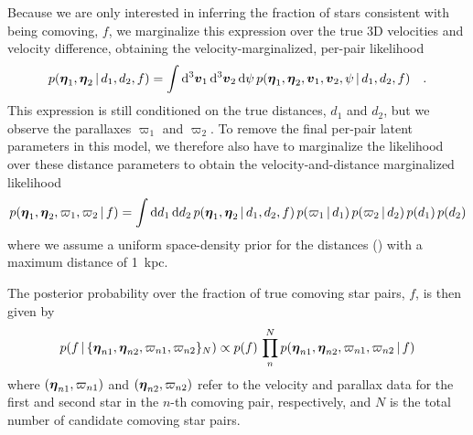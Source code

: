 \documentclass[modern, letterpaper]{aastex61}
\begin{document}
Because we are only interested in inferring the fraction of stars consistent
with being comoving, $f$, we marginalize this expression over the true 3D
velocities and velocity difference, obtaining the velocity-marginalized,
per-pair likelihood
\begin{equation}
    p(\bs{\eta}_1, \bs{\eta}_2 \given d_1, d_2, f) =
    \int \dd^3\bs{v}_1 \, \dd^3\bs{v}_2 \, \dd \psi \,
    p(\bs{\eta}_1, \bs{\eta}_2, \bs{v}_1, \bs{v}_2, \psi \given d_1, d_2, f)
    \quad . \label{eq:vel-marg}
\end{equation}
This expression is still conditioned on the true distances, $d_1$ and $d_2$, but
we observe the parallaxes $\varpi_1$ and $\varpi_2$.
To remove the final per-pair latent parameters in this model, we therefore also
have to marginalize the likelihood over these distance parameters to obtain the
velocity-and-distance marginalized likelihood
\begin{equation}
    p(\bs{\eta}_1, \bs{\eta}_2, \varpi_1, \varpi_2 \given f) =
        \int \dd d_1 \, \dd d_2 \,
        p(\bs{\eta}_1, \bs{\eta}_2 \given d_1, d_2, f) \,
        p(\varpi_1 \given d_1) \, p(\varpi_2 \given d_2) \,
        p(d_1) \, p(d_2)
\end{equation}
where we assume a uniform space-density prior for the distances
(\citealt{Bailer-Jones:2015aa}) with a maximum distance of 1~kpc.

The posterior probability over the fraction of true comoving star pairs, $f$, is
then given by
\begin{equation}
    p(f \given \{\bs{\eta}_{n1}, \bs{\eta}_{n2}, \varpi_{n1}, \varpi_{n2}\}_N)
        \propto p(f) \, \prod_n^N
        p(\bs{\eta}_{n1}, \bs{\eta}_{n2}, \varpi_{n1}, \varpi_{n2} \given f)
\end{equation}
where $(\boldsymbol{\eta}_{n1}, \varpi_{n1})$ and $(\boldsymbol{\eta}_{n2}, \varpi_{n2})$ refer
to the velocity and parallax data for the first and second star in the $n$-th
comoving pair, respectively, and $N$ is the total number of candidate comoving
star pairs.
\end{document}
